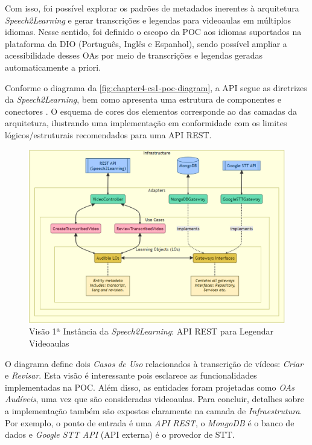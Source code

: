 Com isso, foi possível explorar os padrões de metadados inerentes à arquitetura \textit{Speech2Learning} e gerar transcrições e legendas para videoaulas em múltiplos idiomas. Nesse sentido, foi definido o escopo da POC aos idiomas suportados na plataforma da DIO (Português, Inglês e Espanhol), sendo possível ampliar a acessibilidade desses OAs por meio de transcrições e legendas geradas automaticamente a priori.

Conforme o diagrama da \autoref{fig:chapter4-cs1-poc-diagram}, a API segue as diretrizes da \textit{Speech2Learning}, bem como apresenta uma estrutura de componentes e conectores \cite{Bass2021}. O esquema de cores dos elementos corresponde ao das camadas da arquitetura, ilustrando uma implementação em conformidade com os limites lógicos/estruturais recomendados para uma API REST.

\begin{figure}[htb]
\centering
\caption{Visão 1ª Instância da \textit{Speech2Learning}: API REST para Legendar Videoaulas}
\label{fig:chapter4-cs1-poc-diagram}
\includegraphics[width=\columnwidth]{images/chapter4-cs1-poc-diagram.png}
\end{figure}

O diagrama define dois \textit{Casos de Uso} relacionados à transcrição de vídeos: \textit{Criar} e \textit{Revisar}. Esta visão é interessante pois esclarece as funcionalidades implementadas na POC. Além disso, as entidades foram projetadas como \textit{OAs Audíveis}, uma vez que são consideradas videoaulas. Para concluir, detalhes sobre a implementação também são expostos claramente na camada de \textit{Infraestrutura}. Por exemplo, o ponto de entrada é uma \textit{API REST}, o \textit{MongoDB} é o banco de dados e \textit{Google STT API} (API externa) é o provedor de STT.

